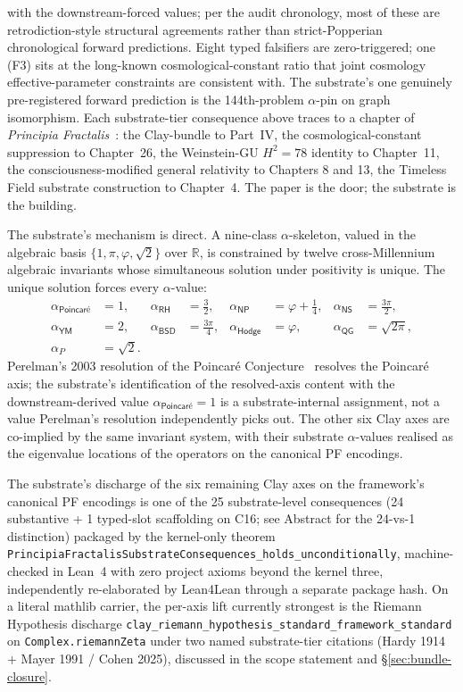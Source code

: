 \documentclass[11pt,a4paper]{amsart}
\theoremstyle{plain}
\theoremstyle{definition}
\begin{document}
with the downstream-forced values; per the audit chronology, most of these are retrodiction-style structural agreements rather than strict-Popperian chronological forward predictions. Eight typed falsifiers are zero-triggered; one (F3) sits at the long-known cosmological-constant ratio that joint cosmology effective-parameter constraints are consistent with. The substrate's one genuinely pre-registered forward prediction is the 144th-problem $\alpha$-pin on graph isomorphism. Each substrate-tier consequence above traces to a chapter of \emph{Principia Fractalis}~\cite{cohen2026book}: the Clay-bundle to Part~IV, the cosmological-constant suppression to Chapter~26, the Weinstein-GU $H^2 = 78$ identity to Chapter~11, the consciousness-modified general relativity to Chapters 8 and 13, the Timeless Field substrate construction to Chapter~4. The paper is the door; the substrate is the building.

The substrate's mechanism is direct. A nine-class $\alpha$-skeleton, valued in the algebraic basis $\{1,\pi,\varphi,\sqrt{2}\}$ over $\mathbb{R}$, is constrained by twelve cross-Millennium algebraic invariants whose simultaneous solution under positivity is unique. The unique solution forces every $\alpha$-value:
\[
\begin{aligned}
\alpha_{\textsf{Poincar\'e}} &= 1, &
\alpha_{\textsf{RH}} &= \tfrac{3}{2}, &
\alpha_{\textsf{NP}} &= \varphi + \tfrac{1}{4}, &
\alpha_{\textsf{NS}} &= \tfrac{3\pi}{2},\\
\alpha_{\textsf{YM}} &= 2, &
\alpha_{\textsf{BSD}} &= \tfrac{3\pi}{4}, &
\alpha_{\textsf{Hodge}} &= \varphi, &
\alpha_{\textsf{QG}} &= \sqrt{2\pi},\\
\alpha_{P} &= \sqrt{2}. & & & & & &
\end{aligned}
\]
Perelman's 2003 resolution of the Poincar\'e Conjecture~\cite{perelman2003} resolves the Poincar\'e axis; the substrate's identification of the resolved-axis content with the downstream-derived value $\alpha_{\textsf{Poincar\'e}}=1$ is a substrate-internal assignment, not a value Perelman's resolution independently picks out. The other six Clay axes are co-implied by the same invariant system, with their substrate $\alpha$-values realised as the eigenvalue locations of the operators on the canonical PF encodings.

The substrate's discharge of the six remaining Clay axes on the framework's canonical PF encodings is one of the 25 substrate-level consequences (24 substantive + 1 typed-slot scaffolding on C16; see Abstract for the 24-vs-1 distinction) packaged by the kernel-only theorem \texttt{PrincipiaFractalisSubstrateConsequences\_holds\_unconditionally}, machine-checked in Lean~4 with zero project axioms beyond the kernel three, independently re-elaborated by Lean4Lean through a separate package hash. On a literal mathlib carrier, the per-axis lift currently strongest is the Riemann Hypothesis discharge \texttt{clay\_riemann\_hypothesis\_standard\_framework\_standard} on \texttt{Complex.riemannZeta} under two named substrate-tier citations (Hardy 1914 + Mayer 1991 / Cohen 2025), discussed in the scope statement and \S\ref{sec:bundle-closure}.
\end{document}
